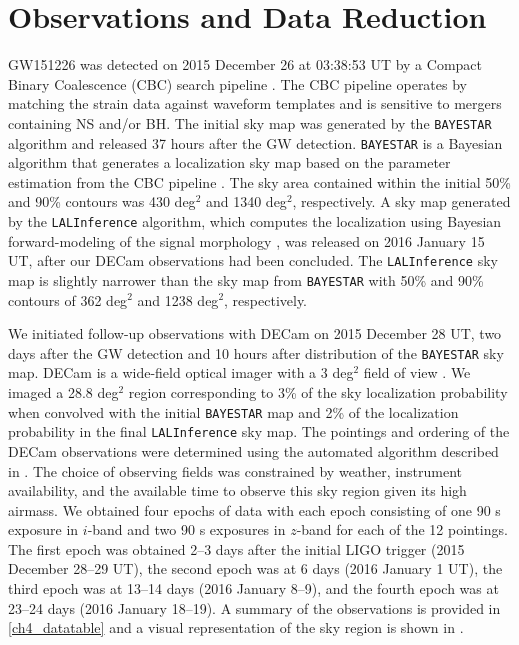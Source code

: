\clearpage
\section{Observations and Data Reduction}
\label{sec:ch4_obs}

GW151226 was detected on 2015 December 26 at 03:38:53 UT by a
Compact Binary Coalescence (CBC) search pipeline \citep{LIGOGW151226}. The CBC
pipeline operates by matching the strain data against waveform
templates and is sensitive to mergers containing NS and/or BH.
The initial sky map was generated by the {\tt BAYESTAR} algorithm
and released 37 hours after the GW detection. {\tt BAYESTAR} is a Bayesian
algorithm that generates a localization sky map based on the parameter
estimation from the CBC pipeline \citep{Singer+14,SingerPrice16}. The sky area contained within the
initial 50\% and 90\% contours was 430 deg$^2$ and 1340 deg$^2$,
respectively. A sky map generated by the {\tt LALInference}
algorithm, which computes the localization using Bayesian forward-modeling
of the signal morphology \citep{Veitch+15}, was released on 2016 January 15 UT,
after our DECam observations had been concluded. The {\tt LALInference} sky map
is slightly narrower than the sky map from {\tt BAYESTAR} with 50\% and 90\% contours
of 362 deg$^2$ and 1238 deg$^2$, respectively.

We initiated follow-up observations with DECam on 2015 December 28 UT,
two days after the GW detection and 10 hours after distribution of the {\tt BAYESTAR}
sky map. DECam is a wide-field optical imager with a 3 deg$^2$ field of view
\citep{Flaugher+15}. We imaged a 28.8 deg$^2$ region corresponding to 3\%
of the sky localization probability when convolved with the initial {\tt BAYESTAR} map
and 2\% of the localization probability in the final {\tt LALInference} sky map.
The pointings and ordering of the DECam observations were determined using
the automated algorithm described in \citet{GW150914DECam}. The choice
of observing fields was constrained by weather, instrument availability, and the available
time to observe this sky region given its high airmass. We
obtained four epochs of data with each epoch consisting of one 90 s
exposure in $i$-band and two 90 s exposures in $z$-band for each of the 12 pointings. The first
epoch was obtained 2--3 days after the initial LIGO trigger (2015
December 28--29 UT), the second epoch was at 6 days (2016 January 1
UT), the third epoch was at 13--14 days (2016 January 8--9), and the
fourth epoch was at 23--24 days (2016 January 18--19). A summary of
the observations is provided in \cref{ch4_datatable} and a visual
representation of the sky region is shown in
.

